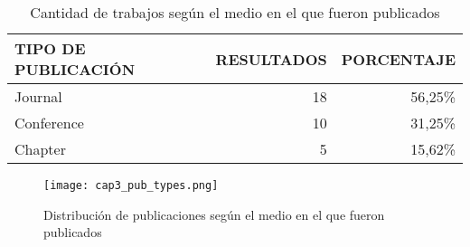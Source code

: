 \begin{table}[H]
  \begin{center}
  \begin{tabular}{| m{4cm} | r | r |}
    \hline
    TIPO DE PUBLICACIÓN & RESULTADOS & PORCENTAJE \\
    \hline
    \hline 
    Journal & 18 & 56,25\% \\
    \hline
    Conference & 10 & 31,25\% \\
    \hline
    Chapter & 5 & 15,62\% \\
    \hline
  \end{tabular}
\end{center}
\caption{Cantidad de trabajos según el medio en el que fueron publicados}
\label{tab:ResumenForumResultados}
\end{table} 

\begin{figure}[H]
  \begin{center}
    \texttt{[image: cap3\_pub\_types.png]}
  \end{center}
  \caption{Distribución de publicaciones según el medio en el que fueron publicados}
  \label{fig:PublicacionesTipos}
\end{figure}

